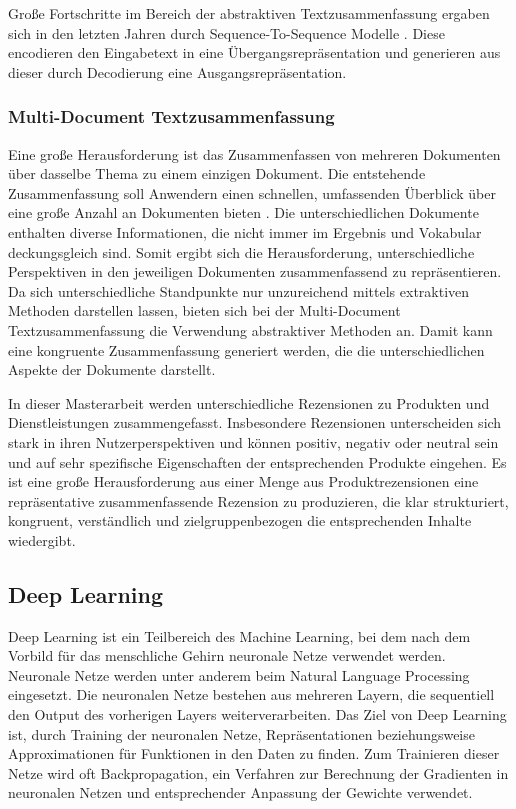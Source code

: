 Große Fortschritte im Bereich der abstraktiven Textzusammenfassung ergaben sich in den letzten Jahren durch Sequence-To-Sequence Modelle \citep{DBLP:journals/corr/NallapatiXZ16}. Diese encodieren den Eingabetext in eine Übergangsrepräsentation und generieren aus dieser durch Decodierung eine Ausgangsrepräsentation.

\subsubsection{Multi-Document Textzusammenfassung}
Eine große Herausforderung ist das Zusammenfassen von mehreren Dokumenten über dasselbe Thema zu einem einzigen Dokument. 
Die entstehende Zusammenfassung soll Anwendern einen schnellen, umfassenden Überblick über eine große Anzahl an Dokumenten bieten \citep{DBLP:journals/corr/abs-2011-04843}. 
Die unterschiedlichen Dokumente enthalten diverse Informationen, die nicht immer im Ergebnis und Vokabular deckungsgleich sind. 
Somit ergibt sich die Herausforderung, unterschiedliche Perspektiven in den jeweiligen Dokumenten zusammenfassend zu repräsentieren.
Da sich unterschiedliche Standpunkte nur unzureichend mittels extraktiven Methoden darstellen lassen, bieten sich bei der Multi-Document Textzusammenfassung die Verwendung abstraktiver Methoden an.
Damit kann eine kongruente Zusammenfassung generiert werden, die die unterschiedlichen Aspekte der Dokumente darstellt.

In dieser Masterarbeit werden unterschiedliche Rezensionen zu Produkten und Dienstleistungen zusammengefasst. 
Insbesondere Rezensionen unterscheiden sich stark in ihren Nutzerperspektiven und können positiv, negativ oder neutral sein und auf sehr spezifische Eigenschaften der entsprechenden Produkte eingehen.
Es ist eine große Herausforderung aus einer Menge aus Produktrezensionen eine repräsentative zusammenfassende Rezension zu produzieren, die klar strukturiert, kongruent, verständlich und zielgruppenbezogen die entsprechenden Inhalte wiedergibt.

\subsection{Deep Learning}
Deep Learning ist ein Teilbereich des Machine Learning, bei dem nach dem Vorbild für das menschliche Gehirn neuronale Netze verwendet werden. 
Neuronale Netze werden unter anderem beim Natural Language Processing eingesetzt. 
Die neuronalen Netze bestehen aus mehreren Layern, die sequentiell den Output des vorherigen Layers weiterverarbeiten. 
Das Ziel von Deep Learning ist, durch Training der neuronalen Netze, Repräsentationen beziehungsweise Approximationen für Funktionen in den Daten zu finden.
Zum Trainieren dieser Netze wird oft Backpropagation, ein Verfahren zur Berechnung der Gradienten in neuronalen Netzen und entsprechender Anpassung der Gewichte verwendet.

